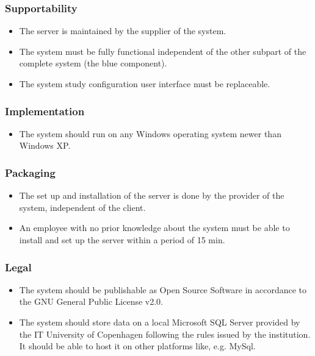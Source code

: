 \subsubsection{Supportability}

\begin{itemize}
\item The server is maintained by the supplier of the system.
\item The system must be fully functional independent of the other subpart of the complete system (the blue component).
\item The system study configuration user interface must be replaceable.
\end{itemize}

\subsubsection{Implementation}

\begin{itemize}
\item The system should run on any Windows operating system newer than Windows XP.
\end{itemize}

\subsubsection{Packaging}

\begin{itemize}
\item The set up and installation of the server is done by the provider of the system, independent of the client.
\item An employee with no prior knowledge about the system must be able to install and set up the server within a period of 15 min.
\end{itemize}

\subsubsection{Legal}

\begin{itemize}
\item The system should be publishable as Open Source Software in accordance to the GNU General Public License v2.0.
\item The system should store data on a local Microsoft SQL Server provided by the IT University of Copenhagen following the rules issued by the institution. It should be able to host it on other platforms like, e.g. MySql.
\end{itemize}

